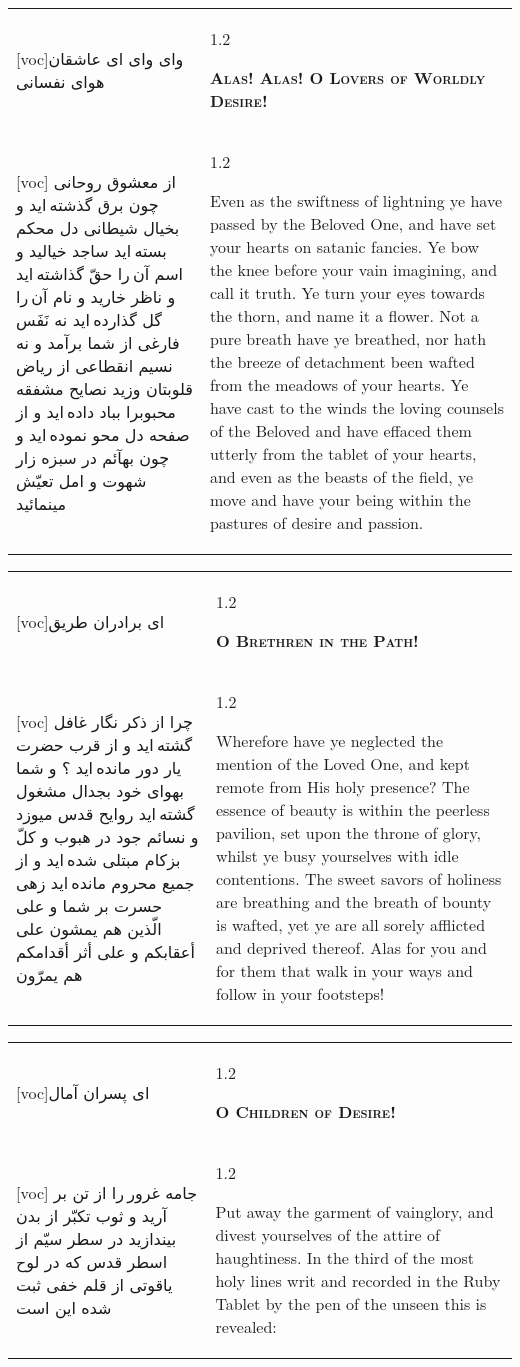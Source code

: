 \documentclass[11pt]{article}
\makeatletter
\newenvironment{orig}
  {\begin{farsi}[voc]}
  {\end{farsi}}
\newenvironment{trans}
  {\Large\begin{spacing}{1.2}\raggedright}
  {\end{spacing}}
\newenvironment{word}
  {\begin{tabular}[t]{p{2.75in}@{\hspace{3em}}p{2.75in}}}
  {\end{tabular}}
\newcommand{\ayat}[2]{\begin{orig}#1\end{orig} & \begin{trans}#2\end{trans}}
\newcommand{\heading}[2]{\textsc{\textbf{#1}} %
}
\makeatother
\begin{document}
\pagebreak

\begin{word}
\ayat{وای وای ای عاشقان هوای نفسانی}{\heading{Alas!  Alas!  O Lovers of Worldly Desire!}{}} \\ \ayat{
از معشوق روحانی چون برق گذشته ايد و بخيال شيطانی دل محکم بسته ايد
ساجد خياليد و اسم آن را حقّ گذاشته ايد و ناظر خاريد و نام آن را گل گذارده ايد نه نَفَس فارغی از شما برآمد و نه نسيم انقطاعی از رياض قلوبتان وزيد
نصايح مشفقه محبوبرا بباد داده ايد و از صفحه دل محو نموده ايد و چون بهآئم در سبزه زار شهوت و امل تعيّش مينمائيد
}{
  Even as the swiftness of lightning ye have passed by the Beloved One, and
  have set your hearts on satanic fancies. Ye bow the knee before your vain
  imagining, and call it truth. Ye turn your eyes towards the thorn, and name
  it a flower. Not a pure breath have ye breathed, nor hath the breeze of
  detachment been wafted from the meadows of your hearts. Ye have cast to the
  winds the loving counsels of the Beloved and have effaced them utterly from
  the tablet of your hearts, and even as the beasts of the field, ye move and
  have your being within the pastures of desire and passion.
}
\end{word}

\pagebreak

\begin{word}
\ayat{ای برادران طريق}{\heading{O Brethren in the Path!}{}} \\ \ayat{
چرا از ذکر نگار غافل گشته ايد و از قرب حضرت يار دور مانده ايد ؟ و شما بهوای خود بجدال مشغول گشته ايد
روايح قدس ميوزد و نسائم جود در هبوب و کلّ بزکام مبتلی شده ايد و از جميع محروم مانده ايد
زهی حسرت بر شما و علی الّذين هم يمشون علی أعقابکم و علی أثر أقدامکم هم يمرّون
}{
  Wherefore have ye neglected the mention of the Loved One, and kept remote
  from His holy presence? The essence of beauty is within the peerless
  pavilion, set upon the throne of glory, whilst ye busy yourselves with idle
  contentions. The sweet savors of holiness are breathing and the breath of
  bounty is wafted, yet ye are all sorely afflicted and deprived thereof. Alas
  for you and for them that walk in your ways and follow in your footsteps!
}
\end{word}

\pagebreak

\begin{word}
\ayat{ای پسران آمال}{\heading{O Children of Desire!}{}} \\ \ayat{
جامه غرور را از تن بر آريد و ثوب تکبّر از بدن بيندازيد در سطر سيّم از اسطر قدس که در لوح ياقوتی از قلم خفی ثبت شده اين است
}{
  Put away the garment of vainglory, and divest yourselves of the attire of
  haughtiness. In the third of the most holy lines writ and recorded in the
  Ruby Tablet by the pen of the unseen this is revealed:
}
\end{word}
\end{document}
